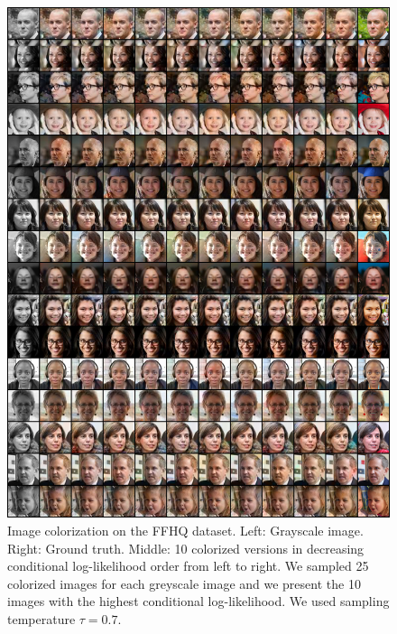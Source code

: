 \begin{figure}[h!]
    \centering
    \includegraphics[width=\textwidth]{Chapter1/paper_graphs/SupplementaryMaterial/colorization_ffhq_T_0.7_0.png}
    \caption{Image colorization on the FFHQ dataset. Left: Grayscale image. Right: Ground truth. Middle: 10 colorized versions in decreasing conditional log-likelihood order from left to right. We sampled 25 colorized images for each greyscale image and we present the 10 images with the highest conditional log-likelihood. We used sampling temperature $\tau=0.7$.}
\end{figure}

